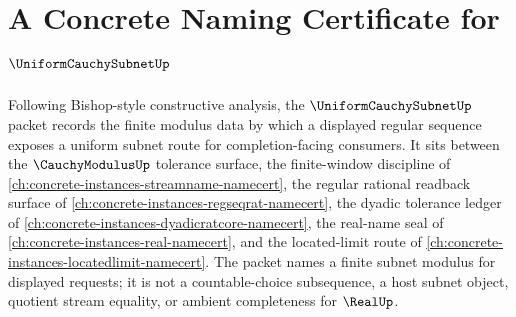 \chapter{A Concrete Naming Certificate for $\UniformCauchySubnetUp$}
\label{ch:concrete-instances-uniform-cauchy-subnet-namecert}

Following Bishop-style constructive analysis, the $\UniformCauchySubnetUp$ packet records the finite modulus data by which a displayed regular sequence exposes a uniform subnet route for completion-facing consumers. It sits between the $\CauchyModulusUp$ tolerance surface, the finite-window discipline of \autoref{ch:concrete-instances-streamname-namecert}, the regular rational readback surface of \autoref{ch:concrete-instances-regseqrat-namecert}, the dyadic tolerance ledger of \autoref{ch:concrete-instances-dyadicratcore-namecert}, the real-name seal of \autoref{ch:concrete-instances-real-namecert}, and the located-limit route of \autoref{ch:concrete-instances-locatedlimit-namecert}. The packet names a finite subnet modulus for displayed requests; it is not a countable-choice subsequence, a host subnet object, quotient stream equality, or ambient completeness for $\RealUp$.

